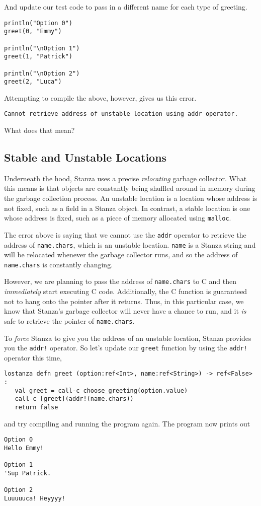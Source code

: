\documentclass[10pt,oneside]{book}
\begin{document}
And update our test code to pass in a different name for each type of greeting.
\begin{lstlisting}
println("Option 0")
greet(0, "Emmy")

println("\nOption 1")
greet(1, "Patrick")

println("\nOption 2")
greet(2, "Luca")
\end{lstlisting}

Attempting to compile the above, however, gives us this error.
\begin{lstlisting}
Cannot retrieve address of unstable location using addr operator.
\end{lstlisting}
What does that mean?

\subsection*{Stable and Unstable Locations}
Underneath the hood, Stanza uses a precise {\em relocating} garbage collector. What this means is that objects are constantly being shuffled around in memory during the garbage collection process. An unstable location is a location whose address is not fixed, such as a field in a Stanza object. In contrast, a stable location is one whose address is fixed, such as a piece of memory allocated using \texttt{\frenchspacing malloc}.

The error above is saying that we cannot use the \texttt{\frenchspacing addr} operator to retrieve the address of \texttt{\frenchspacing name.chars}, which is an unstable location. \texttt{\frenchspacing name} is a Stanza string and will be relocated whenever the garbage collector runs, and so the address of \texttt{\frenchspacing name.chars} is constantly changing. 

However, we are planning to pass the address of \texttt{\frenchspacing name.chars} to C and then {\em immediately} start executing C code. Additionally, the C function is guaranteed not to hang onto the pointer after it returns. Thus, in this particular case, we know that Stanza's garbage collector will never have a chance to run, and it {\em is} safe to retrieve the pointer of \texttt{\frenchspacing name.chars}.

To {\em force} Stanza to give you the address of an unstable location, Stanza provides you the \texttt{\frenchspacing addr!} operator. So let's update our \texttt{\frenchspacing greet} function by using the \texttt{\frenchspacing addr!} operator this time,
\begin{lstlisting}
lostanza defn greet (option:ref<Int>, name:ref<String>) -> ref<False> :
   val greet = call-c choose_greeting(option.value)
   call-c [greet](addr!(name.chars))
   return false
\end{lstlisting}
and try compiling and running the program again. The program now prints out
\begin{lstlisting}
Option 0
Hello Emmy!

Option 1
'Sup Patrick.

Option 2
Luuuuuca! Heyyyy!
\end{lstlisting}
\end{document}
